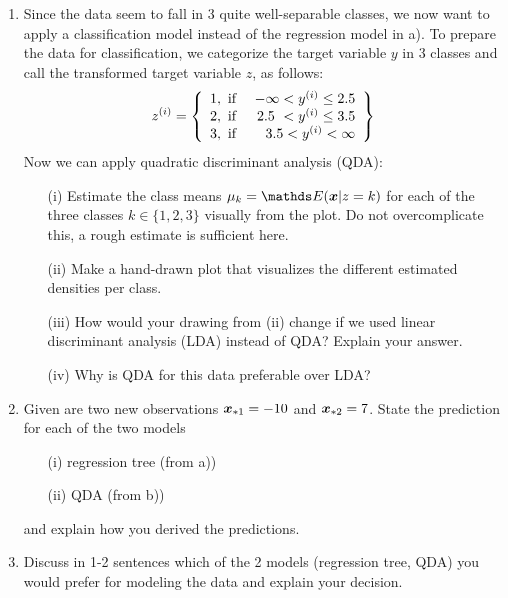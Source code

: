 \documentclass[a4paper]{article}
\newcounter{loes}
\begin{document}
{\begin{enumerate}
  \item Since the data seem to fall in 3 quite well-separable classes, we now 
  want to apply a classification model instead of the regression model in a). 
  To prepare the data for classification, we categorize the target variable $y$ 
  in 3 classes and call the transformed target variable $z$, as follows:
  \[
    z^{(i)} = \left\{\begin{array}{lr}
        1, \text{ if }&  -\infty < y^{(i)} \leq 2.5 \\
        2, \text{ if }&  2.5\ < y^{(i)} \leq 3.5 \\
        3, \text{ if }&  3.5 < y^{(i)} < \infty
        \end{array} \right\}
  \]
  Now we can apply quadratic discriminant analysis (QDA):
  \begin{enumerate}
    \item[(i)] Estimate the class means $\mu_k = \E(\xv|z = k)$ for each of the 
    three classes $k \in \{1, 2, 3\}$ visually from the plot. Do not 
    overcomplicate this, a rough estimate is sufficient here.
    \item[(ii)] Make a hand-drawn plot that visualizes the different estimated 
    densities per class.
    \item[(iii)] How would your drawing from (ii) change if we used linear 
    discriminant analysis (LDA) instead of QDA? Explain your answer.
    \item[(iv)] Why is QDA for this data preferable over LDA?
  \end{enumerate}  
  \item Given are two new observations $\bm{x}_{*1} = -10$ and $\bm{x}_{*2} = 7$. 
  State the prediction for each of the two models 
  \begin{enumerate}
    \item[(i)] regression tree (from a))
    \item[(ii)] QDA (from b))
  \end{enumerate}
  and explain how you derived the predictions.
  \item Discuss in 1-2 sentences which of the 2 models (regression tree, QDA) 
  you would prefer for modeling the data and explain your decision.
\end{enumerate}

\dlz
\loesung{

}}
\end{document}
